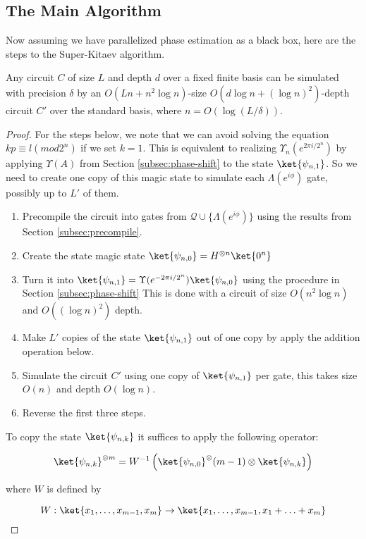 \subsection{The Main Algorithm}
\label{subsec:main}

Now assuming we have parallelized phase estimation as a black box, here are
the steps to the Super-Kitaev algorithm.

\begin{theorem}[Theorem 13.5]
Any circuit $C$ of size $L$ and depth $d$ over a fixed finite basis can be
simulated with precision $\delta$ by an $O(Ln + n^2\log n)$-size
$O(d \log n + (\log n)^2)$-depth circuit $C'$ over the standard basis, where
$n = O(\log(L/\delta))$.
\end{theorem}

\begin{proof}

For the steps below, we note that we can avoid solving the equation $kp \equiv l (mod 2^n)$
if we set $k=1$. This is equivalent to realizing $\Upsilon_n(e^{2\pi i / 2^n})$
by applying $\Upsilon(A)$ from Section \ref{subsec:phase-shift} to the state
$\ket{\psi_{n,1}}$. So we need to create one copy of this magic state to
simulate each $\Lambda(e^{i\phi})$ gate, possibly up to $L'$ of them.

\begin{enumerate}
\item Precompile the circuit into gates from $\mathcal{Q} \cup \{\Lambda(e^{i\phi})\}$
using the results from Section \ref{subsec:precompile}.
\item Create the state magic state $\ket{\psi_{n,0}} = H^{\otimes n}\ket{0^n}$
\item Turn it into $\ket{\psi_{n,1}} = \Upsilon(e^{-2\pi i / 2^n}) \ket{\psi_{n,0}}$
using the procedure in Section \ref{subsec:phase-shift}
This is done with a circuit of size $O(n^2\log n)$ and $O((\log n)^2)$ depth.
\item Make $L'$ copies of the state $\ket{\psi_{n,1}}$ out of one copy by 
apply the addition operation below.
\item Simulate the circuit $C'$ using one copy of $\ket{\psi_{n,1}}$ per gate,
this takes size $O(n)$ and depth $O(\log n)$.
\item Reverse the first three steps.
\end{enumerate}

To copy the state $\ket{\psi_{n,k}}$ it suffices to apply the following
operator:

\begin{equation}
\ket{\psi_{n,k}}^{\otimes m} = W^{-1}\left( \ket{\psi_{n,0}}^\otimes(m-1) \otimes \ket{\psi_{n,k}} \right)
\end{equation}

where $W$ is defined by

\begin{equation}
W : \ket{x_1,\ldots,x_{m-1},x_m} \rightarrow \ket{x_1,\ldots,x_{m-1},x_1+\ldots+x_m}
\end{equation}

\end{proof}
